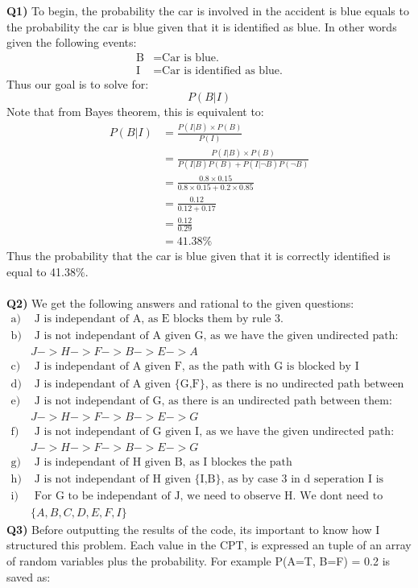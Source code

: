 \documentclass{article}
\begin{document}
\begin{titlepage}
\vspace{0.5cm}
\textbf{Q1)} To begin, the probability the car is involved in the accident is blue equals to the probability the car is blue given that it is identified as blue. In other words given the following events:
\begin{align*}
\text{B} &= \text{Car is blue.} \\
\text{I} &= \text{Car is identified as blue.}
\end{align*}
Thus our goal is to solve for:
\[ P(B|I) \]
Note that from Bayes theorem, this is equivalent to:
\begin{align*}
P(B|I) &= \frac{P(I|B)\times P(B)}{P(I)} \\
&= \frac{P(I|B)\times P(B)}{P(I|B)P(B) + P(I|\neg B)P(\neg B)} \\
&= \frac{0.8 \times 0.15}{0.8 \times 0.15 + 0.2 \times 0.85} \\
&= \frac{0.12}{0.12 + 0.17} \\
&= \frac{0.12}{0.29} \\
&= 41.38\%
\end{align*}
Thus the probability that the car is blue given that it is correctly identified is equal to 41.38$\%$.\\\\
\textbf{Q2)} We get the following answers and rational to the given questions:
\begin{align*}
\text{a)} & \text{ J is independant of A, as E blocks them by rule 3.} \\
\text{b)} & \text{ J is not independant of A given G, as we have the given undirected path:} \\
& J -> H -> F -> B -> E -> A\\
\text{c)} & \text{ J is independant of A given F, as the path with G is blocked by I} \\
\text{d)} & \text{ J is independant of A given \{G,F\}, as there is no undirected path between them.} \\
\text{e)} & \text{ J is not independant of G, as there is an undirected path between them:} \\
& J -> H -> F -> B -> E -> G\\
\text{f)} & \text{ J is not independant of G given I, as we have the given undirected path:} \\
& J -> H -> F -> B -> E -> G \\
\text{g)} & \text{ J is independant of H given B, as I blockes the path} \\
\text{h)} & \text{ J is not independant of H given \{I,B\}, as by case 3 in d seperation I is blocking.} \\
\text{i)} & \text{ For G to be independant of J, we need to observe H. We dont need to oberserve any of the following:} \\
& \{A,B,C,D,E,F,I\}
\end{align*}
\newpage
\textbf{Q3)} Before outputting the results of the code, its important to know how I structured this problem. Each value in the CPT, is expressed an tuple of an array of random variables plus the probability. For example P(A=T, B=F) = 0.2 is saved as:


\end{titlepage}
\end{document}
